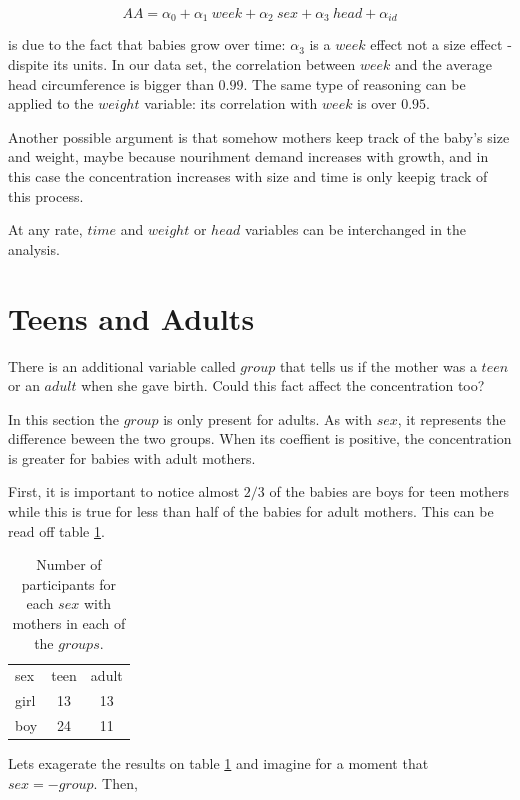 \documentclass[12pt]{article}
\begin{document}
\begin{equation*}
  AA = \alpha_0 + \alpha_1 \ week + \alpha_2 \ sex + \alpha_3 \ head + \alpha_{id}
\end{equation*}

is due to the fact that babies grow over time: $\alpha_3$ is a $week$ effect not a size effect - dispite its units. In our data set, the correlation between $week$ and the average head circumference is bigger than $0.99$. The same type of reasoning can be applied to the $weight$ variable: its correlation with $week$ is over $0.95$.

Another possible argument is that somehow mothers keep track of the baby's size and weight, maybe because nourihment demand increases with growth, and in this case the concentration increases with size and time is only keepig track of this process.

At any rate, $time$ and $weight$ or $head$ variables can be interchanged in the analysis.

\section{Teens and Adults}

There is an additional variable called $group$ that tells us if the mother was a $teen$ or an $adult$ when she gave birth. Could this fact affect the concentration too?

In this section the $group$ is only present for adults. As with $sex$, it represents the difference beween the two groups. When its coeffient is positive, the concentration is greater for babies with adult mothers.

First, it is important to notice almost $2/3$ of the babies are boys for teen mothers while this is true for less than half of the babies for adult mothers. This can be read off table \ref{tab:sexgroup}.

\begin{table}[H]
  \centering
  \begin{tabular}{lcc}
    sex & teen & adult \\
    girl & 13 & 13  \\
    boy & 24 & 11
  \end{tabular}
  \caption{Number of participants for each $sex$ with mothers in each of the $groups$.}
  \label{tab:sexgroup}
\end{table}

Lets exagerate the results on table \ref{tab:sexgroup} and imagine for a moment that $sex = -group$. Then,
\end{document}
